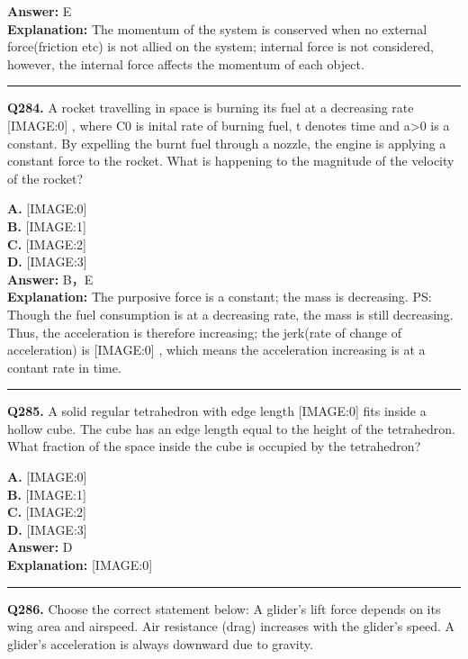 \documentclass[12pt]{article}
\begin{document}
\textbf{Answer:} E \\
\textbf{Explanation:} The momentum of the system is conserved when no external force(friction etc) is not allied on the system; internal force is not considered, however, the internal force affects the momentum of each object.

\hrule
\vspace{1em}


\noindent
\textbf{Q284.} A rocket travelling in space is burning its fuel at a decreasing rate
[IMAGE:0]
, where C0
is inital rate of burning fuel, t
denotes time and a>0
is a constant. By expelling the burnt fuel through a nozzle, the engine is applying a constant force to the rocket.
What is happening to the magnitude of the velocity of the rocket?



\textbf{A.} [IMAGE:0] \\
\textbf{B.} [IMAGE:1] \\
\textbf{C.} [IMAGE:2] \\
\textbf{D.} [IMAGE:3] \\

\textbf{Answer:} B，E \\
\textbf{Explanation:} The purposive force is a constant; the mass is decreasing.
PS: Though the fuel consumption is at a decreasing rate, the mass is still decreasing.
Thus, the acceleration is therefore increasing;
the jerk(rate of change of acceleration) is
[IMAGE:0]
, which means the acceleration increasing is at a contant rate in time.

\hrule
\vspace{1em}


\noindent
\textbf{Q285.} A solid regular tetrahedron with edge length
[IMAGE:0]
fits inside a hollow cube. The cube has an edge length equal to the height of the tetrahedron. What fraction of the space inside the cube is occupied by the tetrahedron?



\textbf{A.} [IMAGE:0] \\
\textbf{B.} [IMAGE:1] \\
\textbf{C.} [IMAGE:2] \\
\textbf{D.} [IMAGE:3] \\

\textbf{Answer:} D \\
\textbf{Explanation:} [IMAGE:0]

\hrule
\vspace{1em}


\noindent
\textbf{Q286.} Choose the correct statement below:
A glider’s lift force depends on its wing area and airspeed.
Air resistance (drag) increases with the glider’s speed.
A glider’s acceleration is always downward due to gravity.
\end{document}
